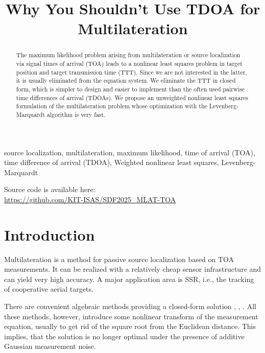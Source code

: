 \documentclass[conference]{IEEEtran}
\begin{document}
\title{Why You Shouldn't Use TDOA for Multilateration}

\author{
}

\maketitle

\begin{abstract}
The maximum likelihood problem arising from multilateration or source localization via signal times of arrival (TOA) leads to a nonlinear least squares problem in target position and target transmission time (TTT). Since we are not interested in the latter, it is usually eliminated from the equation system. We eliminate the TTT in closed form, which is simpler to design and easier to implement than the often used pairwise time differences of arrival (TDOAs). We propose an unweighted nonlinear least squares formulation of the multilateration problem whose optimization with the Levenberg-Marquardt algorithm is very fast. 
\end{abstract}

\begin{IEEEkeywords}
source localization, multilateration, maximum likelihood, time of arrival (TOA), time difference of arrival (TDOA), Weighted nonlinear least squares, Levenberg-Marquardt
\end{IEEEkeywords}

\noindent Source code is available here: \\
\url{https://github.com/KIT-ISAS/SDF2025_MLAT-TOA}

%
%
\section{Introduction} 
%
%
Multilateration is a method for passive source localization based on \ac{TOA} measurements. It can be realized with a relatively cheap sensor infrastructure and can yield very high accuracy. A major application area is \ac{SSR}, i.e., the tracking of cooperative aerial targets. 

%
%
There are convenient algebraic methods providing a closed-form solution 
\cite{Bancroft1985_AnAlgebraicSolutionOfTheGPSEquations}, 
\cite{Norrdine2012_AnAlgebraicSolutionToTheMultilaterationProblem}, 
\cite{Larsson2019_OptimalTrilaterationIsAnEigenvalueProblem}. 
All these methods, however, introduce some nonlinear transform of the measurement equation, usually to get rid of the square root from the Euclidean distance. This implies, that the solution is no longer optimal under the presence of additive Gaussian measurement noise. 
\end{document}
